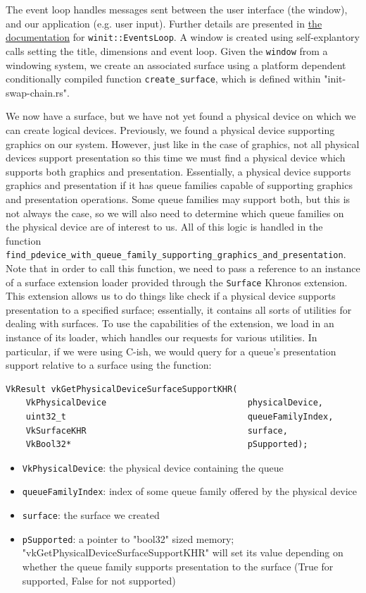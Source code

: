\documentclass[12pt,letterpaper]{article}
\newcommand{\ril}[1]{\texttt{#1}}
\newcommand{\cil}[1]{\texttt{#1}}
\begin{document}
    The event loop handles messages sent between the user interface (the window), and our application (e.g. user input). Further details are presented in \href{https://docs.rs/winit/0.10.0/winit/struct.EventsLoop.html}{the documentation} for \ril{winit::EventsLoop}. A window is created using self-explantory calls setting the title, dimensions and event loop. Given the \ril{window} from a windowing system, we create an associated surface using a platform dependent conditionally compiled function \ril{create_surface}, which is defined within "init-swap-chain.rs".
    
    We now have a surface, but we have not yet found a physical device on which we can create logical devices. Previously, we found a physical device supporting graphics on our system. However, just like in the case of graphics, not all physical devices support presentation so this time we must find a physical device which supports both graphics and presentation. Essentially, a physical device supports graphics and presentation if it has queue families capable of supporting graphics and presentation operations. Some queue families may support both, but this is not always the case, so we will also need to determine which queue families on the physical device are of interest to us. All of this logic is handled in the function \ril{find_pdevice_with_queue_family_supporting_graphics_and_presentation}. Note that in order to call this function, we need to pass a reference to an instance of a surface extension loader provided through the \cil{Surface} Khronos extension. This extension allows us to do things like check if a physical device supports presentation to a specified surface; essentially, it contains all sorts of utilities for dealing with surfaces. To use the capabilities of the extension, we load in an instance of its loader, which handles our requests for various utilities. In particular, if we were using C-ish, we would query for a queue's presentation support relative to a surface using the function:
    \begin{verbatim}
VkResult vkGetPhysicalDeviceSurfaceSupportKHR(
    VkPhysicalDevice                            physicalDevice,
    uint32_t                                    queueFamilyIndex,
    VkSurfaceKHR                                surface,
    VkBool32*                                   pSupported);
    \end{verbatim}
    \begin{itemize}
        \item \cil{VkPhysicalDevice}: the physical device containing the queue
        
        \item \cil{queueFamilyIndex}: index of some queue family offered by the physical device
        
        \item \cil{surface}: the surface we created
        
        \item \cil{pSupported}: a pointer to "bool32" sized memory; "vkGetPhysicalDeviceSurfaceSupportKHR" will set its value depending on whether the queue family supports presentation to the surface (True for supported, False for not supported)
    \end{itemize}
\end{document}
